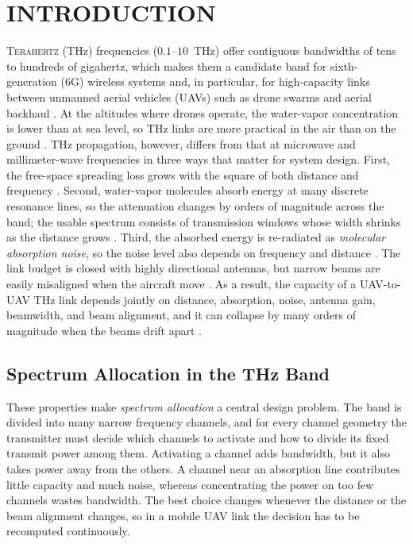 \documentclass[correspondence]{IEEEtaes}
\begin{document}
\section{INTRODUCTION}
\label{sec:intro}
T{\scshape erahertz} (THz) frequencies ($0.1$--$10$~THz) offer contiguous bandwidths of
tens to hundreds of gigahertz, which makes them a candidate band for sixth-generation
(6G) wireless systems and, in particular, for high-capacity links between unmanned
aerial vehicles (UAVs) such as drone swarms and aerial backhaul
\cite{akyildiz2022thz,chaccour2022seven,azari2022thzuav}. At the altitudes where drones
operate, the water-vapor concentration is lower than at sea level, so THz links are more
practical in the air than on the ground \cite{saeed2020altitudes,saeed2021cfb}. THz propagation,
however, differs from that at microwave and millimeter-wave frequencies in three ways that
matter for system design. First, the free-space spreading loss grows with the square of
both distance and frequency \cite{jornet2011channel}. Second, water-vapor molecules
absorb energy at many discrete resonance lines, so the attenuation changes by orders of
magnitude across the band; the usable spectrum consists of transmission windows whose
width shrinks as the distance grows \cite{jornet2011channel,han2016multiwideband}.
Third, the absorbed energy is re-radiated as \emph{molecular absorption noise}, so the
noise level also depends on frequency and distance \cite{jornet2011channel}. The link
budget is closed with highly directional antennas, but narrow beams are easily
misaligned when the aircraft move \cite{moorthy2022beam}. As a result, the capacity of a
UAV-to-UAV THz link depends jointly on distance, absorption, noise, antenna gain,
beamwidth, and beam alignment, and it can collapse by many orders of magnitude when the
beams drift apart \cite{saeed2024maxactive}.

\subsection{Spectrum Allocation in the THz Band}
These properties make \emph{spectrum allocation} a central design problem. The band is
divided into many narrow frequency channels, and for every channel geometry the
transmitter must decide which channels to activate and how to divide its fixed transmit
power among them. Activating a channel adds bandwidth, but it also takes power away from
the others. A channel near an absorption line contributes little capacity and much noise,
whereas concentrating the power on too few channels wastes bandwidth. The best choice
changes whenever the distance or the beam alignment changes, so in a mobile UAV link the
decision has to be recomputed continuously.
\end{document}
